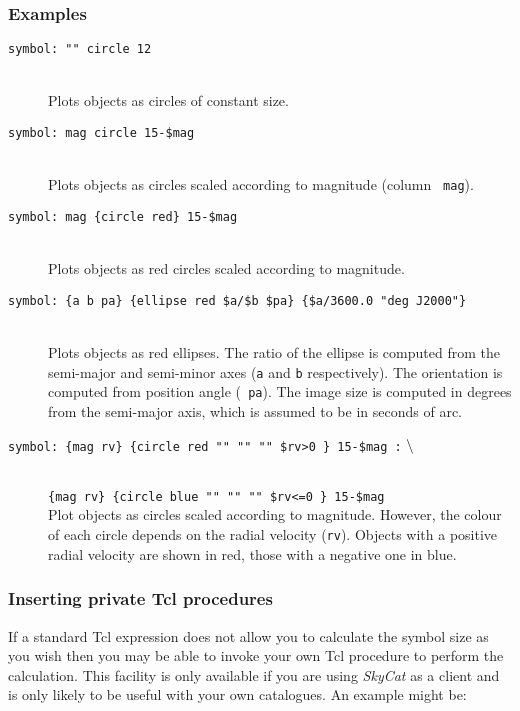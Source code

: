 \documentclass[twoside,11pt]{article}
\renewcommand{\_}{\texttt{\symbol{95}}}
\begin{document}
\subsubsection{Examples}

\begin{description}

  \item[{\tt symbol: "" circle 12}] ~ \\
   Plots objects as circles of constant size.

  \item[{\tt symbol: mag circle 15-\$mag}] ~ \\
   Plots objects as circles scaled according to magnitude (column {\tt
   mag}).

  \item[{\tt symbol: mag \{circle red\} 15-\$mag}] ~ \\
   Plots objects as red circles scaled according to magnitude.

  \item[{\tt symbol: \{a b pa\} \{ellipse red \$a/\$b \$pa\}
   \{\$a/3600.0 "deg J2000"\} }] ~ \\
   Plots objects as red ellipses.  The ratio of the ellipse is computed
   from the semi-major and semi-minor axes ({\tt a} and {\tt b}
   respectively).  The orientation is computed from position angle ({\tt
   pa}).  The image size is computed in degrees from the semi-major axis,
   which is assumed to be in seconds of arc.

  \item[{\tt symbol: \{mag rv\} \{circle red "" "" "" \$rv>0 \} 15-\$mag :}
   ${\tt \backslash}$] ~ \\
   {\tt \{mag rv\} \{circle blue "" "" "" \$rv<=0 \} 15-\$mag} \\
   Plot objects as circles scaled according to magnitude.  However,
   the colour of each circle depends on the radial velocity ({\tt rv}).
   Objects with a positive radial velocity are shown in red, those with
   a negative one in blue.

\end{description}

\subsubsection{Inserting private Tcl procedures}

If a standard Tcl expression does not allow you to calculate the symbol
size as you wish then you may be able to invoke your own Tcl procedure
to perform the calculation.  This facility is only available if you are
using {\it SkyCat}\/ as a client and is only likely to be useful with
your own catalogues.  An example might be:
\end{document}

